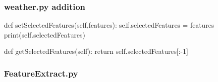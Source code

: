 \documentclass[12pt]{article}
\begin{document}
\subsubsection{weather.py addition}
\begin{python}

    def setSelectedFeatures(self,features):
        self.selectedFeatures = features
        print(self.selectedFeatures)

    def getSelectedFeatures(self):
        return self.selectedFeatures[:-1]

\end{python}

\subsubsection{FeatureExtract.py}
\end{document}
